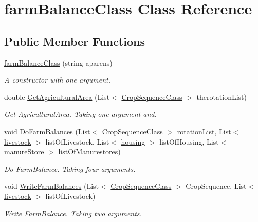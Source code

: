 \hypertarget{classfarm_balance_class}{}\section{farm\+Balance\+Class Class Reference}
\label{classfarm_balance_class}
\subsection*{Public Member Functions}
\begin{DoxyCompactItemize}
\item 
\mbox{\hyperlink{classfarm_balance_class_ae4000127352d82c96afa8c92dfff35fa}{farm\+Balance\+Class}} (string aparens)
\begin{DoxyCompactList}\small\item\em A constructor with one argument. \end{DoxyCompactList}\item 
double \mbox{\hyperlink{classfarm_balance_class_ac063d274bba3a3c59fd0fafc621f21f1}{Get\+Agricultural\+Area}} (List$<$ \mbox{\hyperlink{class_crop_sequence_class}{Crop\+Sequence\+Class}} $>$ therotation\+List)
\begin{DoxyCompactList}\small\item\em Get Agricultural\+Area. Taking one argument and. \end{DoxyCompactList}\item 
void \mbox{\hyperlink{classfarm_balance_class_a5788e7256ac5b931b62fadcdb5403628}{Do\+Farm\+Balances}} (List$<$ \mbox{\hyperlink{class_crop_sequence_class}{Crop\+Sequence\+Class}} $>$ rotation\+List, List$<$ \mbox{\hyperlink{classlivestock}{livestock}} $>$ list\+Of\+Livestock, List$<$ \mbox{\hyperlink{classhousing}{housing}} $>$ list\+Of\+Housing, List$<$ \mbox{\hyperlink{classmanure_store}{manure\+Store}} $>$ list\+Of\+Manurestores)
\begin{DoxyCompactList}\small\item\em Do Farm\+Balance. Taking four arguments. \end{DoxyCompactList}\item 
void \mbox{\hyperlink{classfarm_balance_class_a9642194e0cc01493c3446ecbdbed78c4}{Write\+Farm\+Balances}} (List$<$ \mbox{\hyperlink{class_crop_sequence_class}{Crop\+Sequence\+Class}} $>$ Crop\+Sequence, List$<$ \mbox{\hyperlink{classlivestock}{livestock}} $>$ list\+Of\+Livestock)
\begin{DoxyCompactList}\small\item\em Write Farm\+Balance. Taking two arguments. \end{DoxyCompactList}\end{DoxyCompactItemize}


